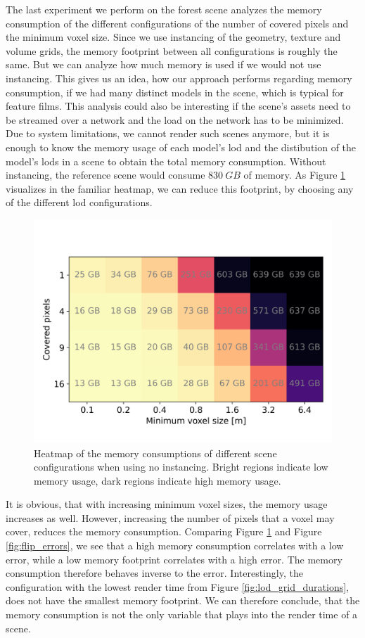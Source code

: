 The last experiment we perform on the forest scene analyzes the memory consumption of the different configurations of the number of covered pixels and the minimum voxel size.
Since we use instancing of the geometry, texture and volume grids, the memory footprint between all configurations is roughly the same.
But we can analyze how much memory is used if we would not use instancing.
This gives us an idea, how our approach performs regarding memory consumption, if we had many distinct models in the scene, which is typical for feature films.
This analysis could also be interesting if the scene's assets need to be streamed over a network and the load on the network has to be minimized.
Due to system limitations, we cannot render such scenes anymore, but it is enough to know the memory usage of each model's \ac{lod} and the distibution of the model's \acsp{lod} in a scene to obtain the total memory consumption.
Without instancing, the reference scene would consume $\SI{830}{GB}$ of memory.
As Figure \ref{fig:memory_usage} visualizes in the familiar heatmap, we can reduce this footprint, by choosing any of the different \ac{lod} configurations.
\begin{figure}[t]
    \centering
    \includegraphics[width=0.49\linewidth]{img/results/memory_usage.png}
    \caption[Visualization of the memory consumption of different scene configurations]{Heatmap of the memory consumptions of different scene configurations when using no instancing. Bright regions indicate low memory usage, dark regions indicate high memory usage.}
    \label{fig:memory_usage}
\end{figure}
It is obvious, that with increasing minimum voxel sizes, the memory usage increases as well.
However, increasing the number of pixels that a voxel may cover, reduces the memory consumption.
Comparing Figure \ref{fig:memory_usage} and Figure \ref{fig:flip_errors}, we see that a high memory consumption correlates with a low \FLIP error, while a low memory footprint correlates with a high \FLIP error.
The memory consumption therefore behaves inverse to the \FLIP error.
Interestingly, the configuration with the lowest render time from Figure \ref{fig:lod_grid_durations}, does not have the smallest memory footprint.
We can therefore conclude, that the memory consumption is not the only variable that plays into the render time of a scene.

